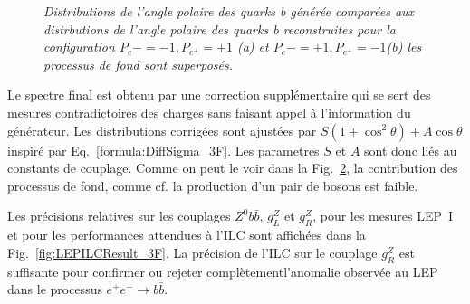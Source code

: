 \begin{figure}
\begin{subfigure}{0.5\textwidth}
		\caption{\label{fig:BAsymmetryFinal_b_3F} }
	\end{subfigure}
	\caption{\sl Distributions de l'angle polaire des quarks b générée comparées aux distrbutions de l'angle polaire des quarks b reconstruites pour la configuration $P_{e}-=-1, P_{e^+}=+1$ (a) et $P_{e}-=+1, P_{e^+}=-1$(b) les processus de fond sont superposés.}
	\label{fig:BAsymmetryFinal_3F}
\end{figure}

Le spectre final est obtenu par une correction supplémentaire qui se sert des mesures contradictoires des charges sans faisant appel à l'information du générateur.  %
Les distributions corrigées sont ajustées par $S(1+\cos^2\theta) + A\cos\theta$ inspiré par Eq.~\ref{formula:DiffSigma_3F}. Les parametres $S$ et $A$ sont donc liés au constants de couplage. 
Comme on peut le voir dans la Fig.~\ref{fig:BAsymmetryFinal_3F}, la contribution des processus de fond, comme cf. la production d'un pair de bosons est faible.


Les précisions relatives sur les couplages $Z^0 b\bar{b}$, $g_L^Z$ et $g_R^Z$, pour les mesures LEP~I et pour les performances attendues à l'ILC sont affichées dans la Fig.~\ref{fig:LEPILCResult_3F}. 
La précision de l'ILC sur le couplage $g_R^Z$ est suffisante pour confirmer ou rejeter complètementl'anomalie observée au LEP dans le processus $e^+e^-\to b\bar{b}$.

